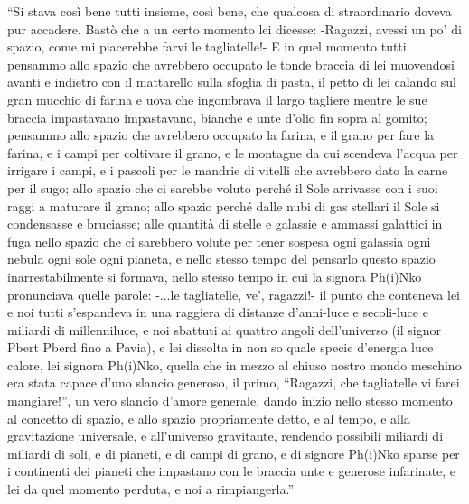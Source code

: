 
\begin{acknowledgements}
\addchaptertocentry{\acknowledgementname} %


\textsf{``Si stava così bene tutti insieme, così bene, che qualcosa di straordinario doveva pur accadere.
Bastò che a un certo momento lei dicesse: -Ragazzi, avessi un po’ di spazio, come mi piacerebbe
farvi le tagliatelle!- E in quel momento tutti pensammo allo spazio che avrebbero occupato le
tonde braccia di lei muovendosi avanti e indietro con il mattarello sulla sfoglia di pasta, il petto
di lei calando sul gran mucchio di farina e uova che ingombrava il largo tagliere mentre le sue
braccia impastavano impastavano, bianche e unte d’olio fin sopra al gomito; pensammo allo
spazio che avrebbero occupato la farina, e il grano per fare la farina, e i campi per coltivare il
grano, e le montagne da cui scendeva l’acqua per irrigare i campi, e i pascoli per le mandrie di
vitelli che avrebbero dato la carne per il sugo; allo spazio che ci sarebbe voluto perché il Sole
arrivasse con i suoi raggi a maturare il grano; allo spazio perché dalle nubi di gas stellari il Sole si
condensasse e bruciasse; alle quantità di stelle e galassie e ammassi galattici in fuga nello spazio
che ci sarebbero volute per tener sospesa ogni galassia ogni nebula ogni sole ogni pianeta, e nello
stesso tempo del pensarlo questo spazio inarrestabilmente si formava, nello stesso tempo in cui la
signora Ph(i)Nko pronunciava quelle parole: -...le tagliatelle, ve’, ragazzi!- il punto che conteneva
lei e noi tutti s’espandeva in una raggiera di distanze d’anni-luce e secoli-luce e miliardi di millenniluce,
e noi sbattuti ai quattro angoli dell’universo (il signor Pbert Pberd fino a Pavia), e lei dissolta
in non so quale specie d’energia luce calore, lei signora Ph(i)Nko, quella che in mezzo al chiuso
nostro mondo meschino era stata capace d’uno slancio generoso, il primo, “Ragazzi, che tagliatelle
vi farei mangiare!”, un vero slancio d’amore generale, dando inizio nello stesso momento al
concetto di spazio, e allo spazio propriamente detto, e al tempo, e alla gravitazione universale, e
all’universo gravitante, rendendo possibili miliardi di miliardi di soli, e di pianeti, e di campi di
grano, e di signore Ph(i)Nko sparse per i continenti dei pianeti che impastano con le braccia unte
e generose infarinate, e lei da quel momento perduta, e noi a
rimpiangerla.''}


\end{acknowledgements}
